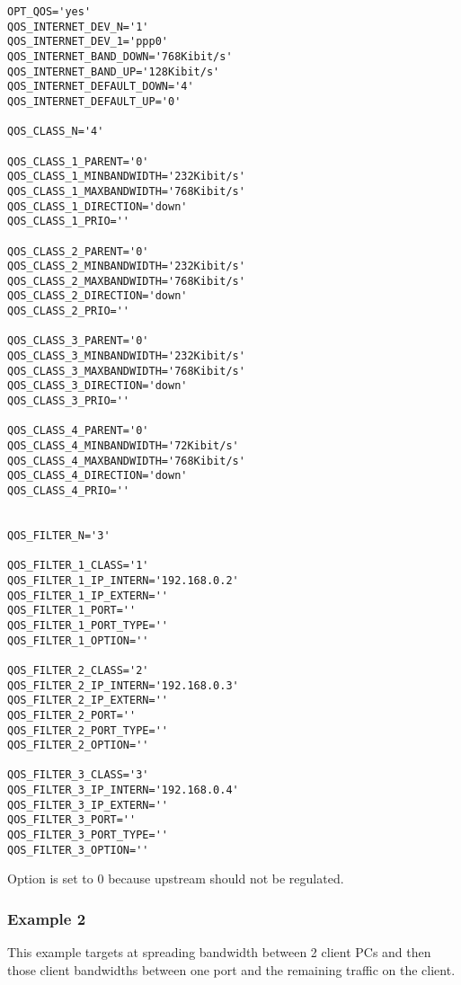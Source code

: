 \begin{small}
\begin{example}
\begin{verbatim}
OPT_QOS='yes'
QOS_INTERNET_DEV_N='1'
QOS_INTERNET_DEV_1='ppp0'
QOS_INTERNET_BAND_DOWN='768Kibit/s'
QOS_INTERNET_BAND_UP='128Kibit/s'
QOS_INTERNET_DEFAULT_DOWN='4'
QOS_INTERNET_DEFAULT_UP='0'

QOS_CLASS_N='4'

QOS_CLASS_1_PARENT='0'
QOS_CLASS_1_MINBANDWIDTH='232Kibit/s'
QOS_CLASS_1_MAXBANDWIDTH='768Kibit/s'
QOS_CLASS_1_DIRECTION='down'
QOS_CLASS_1_PRIO=''

QOS_CLASS_2_PARENT='0'
QOS_CLASS_2_MINBANDWIDTH='232Kibit/s'
QOS_CLASS_2_MAXBANDWIDTH='768Kibit/s'
QOS_CLASS_2_DIRECTION='down'
QOS_CLASS_2_PRIO=''

QOS_CLASS_3_PARENT='0'
QOS_CLASS_3_MINBANDWIDTH='232Kibit/s'
QOS_CLASS_3_MAXBANDWIDTH='768Kibit/s'
QOS_CLASS_3_DIRECTION='down'
QOS_CLASS_3_PRIO=''

QOS_CLASS_4_PARENT='0'
QOS_CLASS_4_MINBANDWIDTH='72Kibit/s'
QOS_CLASS_4_MAXBANDWIDTH='768Kibit/s'
QOS_CLASS_4_DIRECTION='down'
QOS_CLASS_4_PRIO=''


QOS_FILTER_N='3'

QOS_FILTER_1_CLASS='1'
QOS_FILTER_1_IP_INTERN='192.168.0.2'
QOS_FILTER_1_IP_EXTERN=''
QOS_FILTER_1_PORT=''
QOS_FILTER_1_PORT_TYPE=''
QOS_FILTER_1_OPTION=''

QOS_FILTER_2_CLASS='2'
QOS_FILTER_2_IP_INTERN='192.168.0.3'
QOS_FILTER_2_IP_EXTERN=''
QOS_FILTER_2_PORT=''
QOS_FILTER_2_PORT_TYPE=''
QOS_FILTER_2_OPTION=''

QOS_FILTER_3_CLASS='3'
QOS_FILTER_3_IP_INTERN='192.168.0.4'
QOS_FILTER_3_IP_EXTERN=''
QOS_FILTER_3_PORT=''
QOS_FILTER_3_PORT_TYPE=''
QOS_FILTER_3_OPTION=''
\end{verbatim}
\end{example}
\end{small}

   Option  is set to 0 because upstream
   should not be regulated.




\subsubsection{Example 2}



   This example targets at spreading bandwidth between 2 client PCs and
   then those client bandwidths between one port and the remaining traffic
   on the client.


